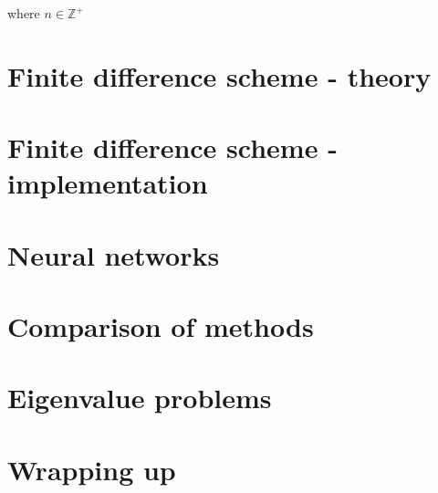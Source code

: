 \documentclass{article}
\begin{document}
where $n \in \mathbb{Z}^{+}$

\section{Finite difference scheme - theory}

\section{Finite difference scheme - implementation}

\section{Neural networks}

\section{Comparison of methods}

\section{Eigenvalue problems}

\section{Wrapping up}
\end{document}
